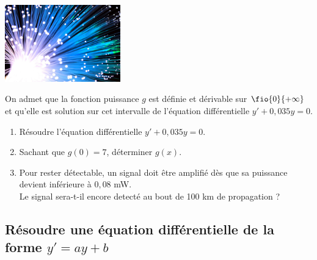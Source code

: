 \documentclass[a4paper,11pt,exos]{nsi} %
\begin{document}
\exo{}
{\includegraphics[width=5cm]{fiber-optic-2749588_1280.jpg}}
\vspace*{.2cm}

On admet que la fonction puissance $g$ est définie et dérivable sur $\fio{0}{+\infty}$ et qu'elle est solution sur cet intervalle de l'équation différentielle $y'+0,035y=0$.

\begin{enumerate}
    \item Résoudre l'équation différentielle $y'+0,035y=0$.
    \item Sachant que $g(0)=7$, déterminer $g(x)$.
    \item Pour rester détectable, un signal doit être amplifié dès que sa puissance devient inférieure à $0,08$ mW.\\
    Le signal sera-t-il encore detecté au bout de 100 km de propagation ?
\end{enumerate}

\subsection*{Résoudre une équation différentielle de la forme $y'=ay+b$}
\end{document}

